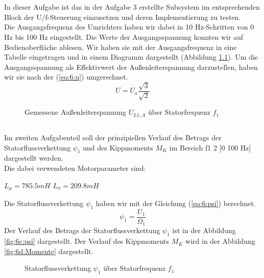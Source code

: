 \chapter{}

\section{}
In dieser Aufgabe ist das in der Aufgabe 3 erstellte Subsystem im entsprechenden Block der U/f-Steuerung einzusetzen und deren Implementierung zu testen.\\
Die Ausgangsfrequenz des Umrichters haben wir dabei in 10 Hz-Schritten von 0 Hz bis 100 Hz eingestellt. Die Werte der Ausgangsspannung konnten wir auf Bedienoberfläche ablesen. Wir haben sie mit der Ausgangsfrequenz in eine Tabelle eingetragen und in einem Diagramm dargestellt (Abbildung \ref{fig:6b:UL}). Um die Ausgangsspannung als Effektivwert der Außenleiterspannung darzustellen, haben wir sie nach der (\ref{eq:6:u}) umgerechnet.
\begin{equation}
	U = U_{a}\frac{\sqrt{3}}{\sqrt{2}}
	\label{eq:6:u}
\end{equation}
\begin{figure}[h]
	\centering
	
	\caption{Gemessene Außenleiterspannung $ U_{L1,A}  $ über Statorfrequenz $ f_{1} $}
	\label{fig:6b:UL}
\end{figure}



\section{}
Im zweiten Aufgabenteil soll der prinzipiellen Verlauf des Betrags der Statorflussverkettung $ \psi_{1} $ und des Kippmoments $ M_{K} $ im Bereich f1 2 [0 100 Hz] dargestellt werden.\\
Die dabei verwendeten Motorparameter sind:
\begin{center}
	$ L_{\mu} = 785.5mH $ \hspace{2cm} $ L_{\sigma} = 209.8mH $
\end{center}
Die Statorflussverkettung $ \psi_{1} $ haben wir mit der Gleichung (\ref{eq:6:psi}) berechnet.
\begin{equation}
	\psi_{1} = \frac{U_{1}}{\Omega_{1}}
	\label{eq:6:psi}
\end{equation}
Der Verlauf des Betrags der Statorflussverkettung $ \psi_{1} $ ist in der Abbildung \ref{fig:6c:psi} dargestellt. Der Verlauf des Kippmoments $ M_{K} $ wird in der Abbildung \ref{fig:6d:Momente} dargestellt.
\begin{figure}[h]
	\centering
	
	\caption{Statorflussverkettung $ \psi_{1} $ über Statorfrequenz $ f_{1} $}
	\label{fig:6b:psi}
\end{figure}




